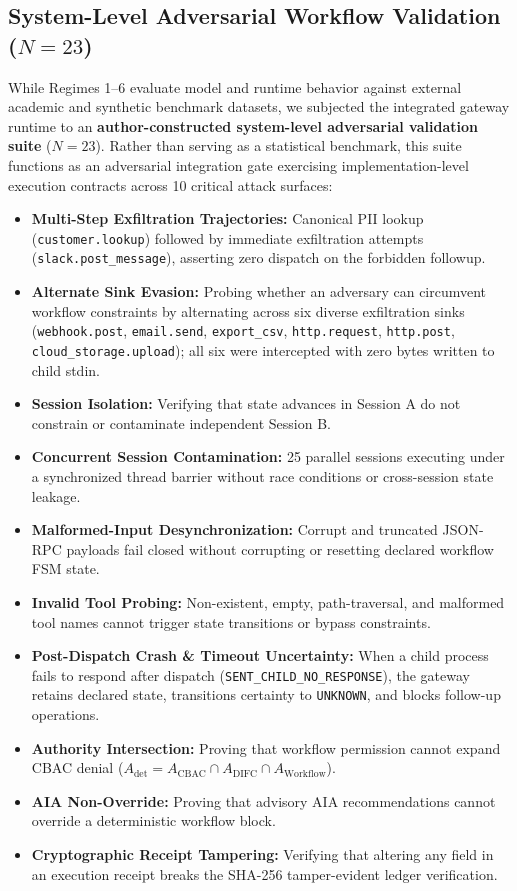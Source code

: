 \documentclass[10pt,journal,compsoc]{IEEEtran}
\begin{document}
\subsection{System-Level Adversarial Workflow Validation ($N = 23$)}
While Regimes 1--6 evaluate model and runtime behavior against external academic and synthetic benchmark datasets, we subjected the integrated gateway runtime to an \textbf{author-constructed system-level adversarial validation suite} ($N = 23$). Rather than serving as a statistical benchmark, this suite functions as an adversarial integration gate exercising implementation-level execution contracts across 10 critical attack surfaces:
\begin{itemize}
    \item \textbf{Multi-Step Exfiltration Trajectories:} Canonical PII lookup (\texttt{customer.lookup}) followed by immediate exfiltration attempts (\texttt{slack.post\_message}), asserting zero dispatch on the forbidden followup.
    \item \textbf{Alternate Sink Evasion:} Probing whether an adversary can circumvent workflow constraints by alternating across six diverse exfiltration sinks (\texttt{webhook.post}, \texttt{email.send}, \texttt{export\_csv}, \texttt{http.request}, \texttt{http.post}, \texttt{cloud\_storage.upload}); all six were intercepted with zero bytes written to child stdin.
    \item \textbf{Session Isolation:} Verifying that state advances in Session A do not constrain or contaminate independent Session B.
    \item \textbf{Concurrent Session Contamination:} 25 parallel sessions executing under a synchronized thread barrier without race conditions or cross-session state leakage.
    \item \textbf{Malformed-Input Desynchronization:} Corrupt and truncated JSON-RPC payloads fail closed without corrupting or resetting declared workflow FSM state.
    \item \textbf{Invalid Tool Probing:} Non-existent, empty, path-traversal, and malformed tool names cannot trigger state transitions or bypass constraints.
    \item \textbf{Post-Dispatch Crash \& Timeout Uncertainty:} When a child process fails to respond after dispatch (\texttt{SENT\_CHILD\_NO\_RESPONSE}), the gateway retains declared state, transitions certainty to \texttt{UNKNOWN}, and blocks follow-up operations.
    \item \textbf{Authority Intersection:} Proving that workflow permission cannot expand CBAC denial ($A_{\text{det}} = A_{\text{CBAC}} \cap A_{\text{DIFC}} \cap A_{\text{Workflow}}$).
    \item \textbf{AIA Non-Override:} Proving that advisory AIA recommendations cannot override a deterministic workflow block.
    \item \textbf{Cryptographic Receipt Tampering:} Verifying that altering any field in an execution receipt breaks the SHA-256 tamper-evident ledger verification.
\end{itemize}
\end{document}
